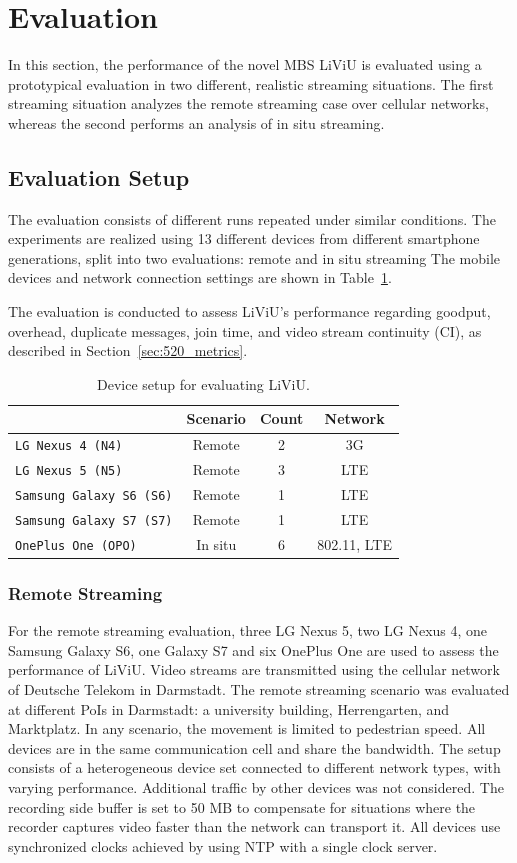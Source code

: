 \section{Evaluation}
\label{sec:530_evaluation}
In this section, the performance of the novel \ac{MBS} \ac{LiViU} is evaluated using a prototypical evaluation in two different, realistic streaming situations.
The first streaming situation analyzes the remote streaming case over cellular networks, whereas the second performs an analysis of in situ streaming.
\subsection{Evaluation Setup}
The evaluation consists of different runs repeated under similar conditions.
The experiments are realized using 13 different devices from different smartphone generations, split into two evaluations: remote and in situ streaming
The mobile devices and network connection settings are shown in Table~\ref{table:530_mobileDevice}.

The evaluation is conducted to assess \ac{LiViU}'s performance regarding goodput, overhead, duplicate messages, join time, and  video stream continuity (\ac{CI}), as described in Section~\ref{sec:520_metrics}.
\begin{table}[h]
	\centering
	\caption{Device setup for evaluating LiViU.}
	\begin{tabular}{l c c c}
		& Scenario &  Count & Network\\ \toprule
		\texttt{LG Nexus 4 (N4)}& Remote & 2 & 3G\\
		\texttt{LG Nexus 5 (N5)}  & Remote & 3	& LTE\\
		\texttt{Samsung Galaxy S6 (S6)}& Remote & 1 & LTE\\
		\texttt{Samsung Galaxy S7 (S7)}& Remote & 1 & LTE\\
		\texttt{OnePlus One (OPO)} &   In situ & 6 & 802.11, LTE \\ 
		\bottomrule
	\end{tabular}
	\label{table:530_mobileDevice}
\end{table} 
\subsubsection{Remote Streaming}
For the remote streaming evaluation, three LG Nexus 5, two LG Nexus 4, one Samsung Galaxy S6, one Galaxy S7 and six OnePlus One are used to assess the performance of \ac{LiViU}.
Video streams are transmitted using the cellular network of Deutsche Telekom in Darmstadt. 
The remote streaming scenario was evaluated at different \ac{PoI}s in Darmstadt: a university building, Herrengarten, and Marktplatz.
In any scenario, the movement is limited to pedestrian speed.
All devices are in the same communication cell and share the bandwidth.
The setup consists of a heterogeneous device set connected to different network types, with varying performance.
Additional traffic by other devices was not considered.
The recording side buffer is set to 50 \unit{MB} to compensate for situations where the recorder captures video faster than the network can transport it.
All devices use synchronized clocks achieved by using \ac{NTP} with a single clock server.

